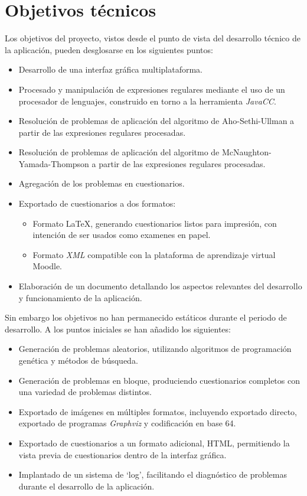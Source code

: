 
\section{Objetivos técnicos}
Los objetivos del proyecto, vistos desde el punto de vista del desarrollo técnico de la aplicación, pueden desglosarse en los siguientes puntos:
\begin{itemize}
	\item Desarrollo de una interfaz gráfica multiplataforma.
	\item Procesado y manipulación de expresiones regulares mediante el uso de un procesador de lenguajes, construido en torno a la herramienta \emph{JavaCC}.
	\item Resolución de problemas de aplicación del algoritmo de Aho-Sethi-Ullman a partir de las expresiones regulares procesadas.
	\item Resolución de problemas de aplicación del algoritmo de McNaughton-Yamada-Thompson a partir de las expresiones regulares procesadas.
	\item Agregación de los problemas en cuestionarios.
	\item Exportado de cuestionarios a dos formatos:
	\begin{itemize}
		\item Formato \LaTeX{}, generando cuestionarios listos para impresión, con intención de ser usados como examenes en papel.
		\item Formato \emph{XML} compatible con la plataforma de aprendizaje virtual Moodle.
	\end{itemize}
	\item Elaboración de un documento detallando los aspectos relevantes del desarrollo y funcionamiento de la aplicación.
\end{itemize}

Sin embargo los objetivos no han permanecido estáticos durante el periodo de desarrollo.
A los puntos iniciales se han añadido los siguientes:
\begin{itemize}
	\item Generación de problemas aleatorios, utilizando algoritmos de programación genética y métodos de búsqueda.
	\item Generación de problemas en bloque, produciendo cuestionarios completos con una variedad de problemas distintos.
	\item Exportado de imágenes en múltiples formatos, incluyendo exportado directo, exportado de programas \emph{Graphviz} y codificación en base 64.
	\item Exportado de cuestionarios a un formato adicional, HTML, permitiendo la vista previa de cuestionarios dentro de la interfaz gráfica.
	\item Implantado de un sistema de `log', facilitando el diagnóstico de problemas durante el desarrollo de la aplicación.
\end{itemize}

